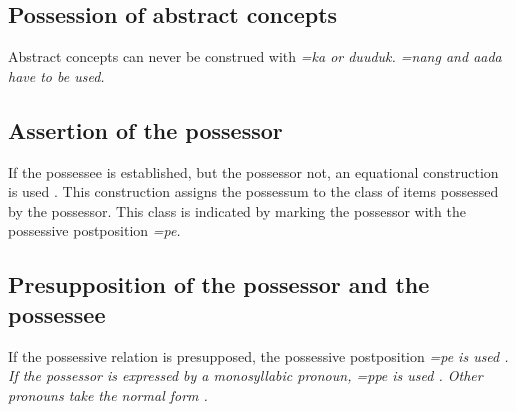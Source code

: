 
\subsection{Possession of abstract concepts}\label{sec:func:Possessionofabstractconcepts}
Abstract concepts can never be construed with \em =ka \em or \em duuduk\em. \em =nang \em and \em aada \em have to be used.


\subsection{Assertion of the possessor}\label{sec:func:Assertionofthepossessor}
If the possessee is established, but the possessor not, an equational construction   is used \citep[cf.][104f]{Hengeveld1992nvpttd}. This construction assigns the possessum to the class of items possessed by the possessor. This class is indicated by marking the possessor with the possessive postposition \em =pe\em.





\subsection{Presupposition of the possessor and the possessee}\label{sec:func:Presuppositionofthepossessorandthepossessee}
If the possessive relation is presupposed, the possessive postposition \em =pe \em  {} is used . If the possessor is expressed by a monosyllabic pronoun, \em =ppe \em is used . Other pronouns take the normal form .



